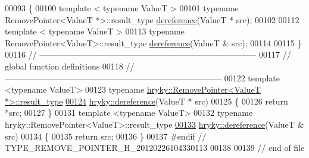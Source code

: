\begin{DoxyCode}
00093 \{
00100     \textcolor{keyword}{template} < \textcolor{keyword}{typename} ValueT >
00101     \textcolor{keyword}{typename} RemovePointer<ValueT *>::result\_type \hyperlink{group__generic__programming_ga74adf3223a4335c89d64f985d0bcc29e}{dereference}(ValueT * src);
00102 
00112     \textcolor{keyword}{template} < \textcolor{keyword}{typename} ValueT >
00113     \textcolor{keyword}{typename} RemovePointer<ValueT>::result\_type \hyperlink{group__generic__programming_ga74adf3223a4335c89d64f985d0bcc29e}{dereference}(ValueT & src);
00114 
00115 \}
00116 \textcolor{comment}{//
      ------------------------------------------------------------------------------}
00117 \textcolor{comment}{// global function definitions}
00118 \textcolor{comment}{//
      ------------------------------------------------------------------------------}
00122 \textcolor{comment}{}\textcolor{keyword}{template} <\textcolor{keyword}{typename} ValueT>
00123 \textcolor{keyword}{typename} \hyperlink{classhryky_1_1_remove_pointer}{hryky::RemovePointer<ValueT *>::result_type}
\hypertarget{remove__pointer_8h_source_l00124}{}\hyperlink{group__generic__programming_ga74adf3223a4335c89d64f985d0bcc29e}{00124} \hyperlink{group__generic__programming_ga74adf3223a4335c89d64f985d0bcc29e}{hryky::dereference}(ValueT * src)
00125 \{
00126     \textcolor{keywordflow}{return} *src;
00127 \}
00131 \textcolor{keyword}{template} <\textcolor{keyword}{typename} ValueT>
00132 \textcolor{keyword}{typename} hryky::RemovePointer<ValueT>::result\_type
\hypertarget{remove__pointer_8h_source_l00133}{}\hyperlink{group__generic__programming_ga4ea1ee0ac8835fd32da649ee7dea3355}{00133} \hyperlink{group__generic__programming_ga74adf3223a4335c89d64f985d0bcc29e}{hryky::dereference}(ValueT & src)
00134 \{
00135     \textcolor{keywordflow}{return} src;
00136 \}
00137 \textcolor{preprocessor}{#endif // TYPE\_REMOVE\_POINTER\_H\_20120226104330113}
00138 \textcolor{preprocessor}{}
00139 \textcolor{comment}{// end of file}
\end{DoxyCode}
